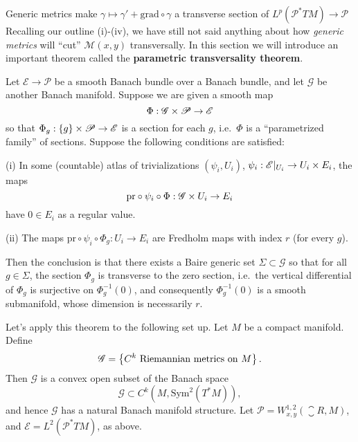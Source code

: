 \documentclass{amsart}
\begin{document}
\begin{clear}{Generic metrics make $\gamma\mapsto
    \gamma'+\text{grad}\circ \gamma$ a transverse section of
    $L^{p}(\mathscr{P}^{*}TM)\to \mathscr{P}$}
  Recalling our outline (i)-(iv), we have still not said anything
  about how \emph{generic metrics} will ``cut'' $\mathscr{M}(x,y)$
  transversally. In this section we will introduce an important
  theorem called the \textbf{parametric transversality theorem}.

  \begin{thm}
    Let $\mathscr{E}\to \mathscr{P}$ be a smooth Banach bundle over a
    Banach bundle, and let $\mathscr{G}$ be another Banach
    manifold. Suppose we are given a smooth map
    \begin{equation*}
      \Phi:\mathscr{G}\times \mathscr{P}\to \mathscr{E}
    \end{equation*}
    so that $\Phi_{g}:\left\{g\right\}\times \mathscr{P}\to \mathscr{E}$ is a
    section for each $g$, i.e.\ $\Phi$ is a ``parametrized family'' of
    sections. Suppose the following conditions are satisfied:

    (i) In some (countable) atlas of trivializations
    $(\psi_{i},U_{i})$, $\psi_{i}:\mathscr{E}|_{U_{i}}\to U_{i}\times
    E_{i}$, the maps
    \begin{equation*}
      \text{pr}\circ \psi_{i}\circ\Phi:\mathscr{G}\times U_{i}\to E_{i}
    \end{equation*}
    have $0\in E_{i}$ as a regular value. 

    (ii) The maps $\text{pr}\circ \psi_{i}\circ \Phi_{g}:U_{i}\to
    E_{i}$ are Fredholm maps with index $r$ (for every $g$). 

    Then the conclusion is that there exists a Baire generic set
    $\Sigma\subset \mathscr{G}$ so that for all $g\in \Sigma$, the
    section $\Phi_{g}$ is transverse to the zero section, i.e.\ the
    vertical differential of $\Phi_{g}$ is surjective on
    $\Phi_{g}^{-1}(0)$, and consequently $\Phi_{g}^{-1}(0)$ is a
    smooth submanifold, whose dimension is necessarily $r$.
  \end{thm}

  \begin{example}
    Let's apply this theorem to the following set up. Let $M$ be a
    compact manifold. Define
    \begin{equation*}
      \mathscr{G}=\left\{C^{k}\text{ Riemannian metrics on $M$}\right\}.
    \end{equation*}
    Then $\mathscr{G}$ is a convex open subset of the Banach space
    \begin{equation*}
      \mathscr{G}\subset C^{k}(M,\text{Sym}^{2}(T^{*}M)),
    \end{equation*}
    and hence $\mathscr{G}$ has a natural Banach manifold
    structure. Let $\mathscr{P}=W^{1,2}_{x,y}(\closure{R},M)$, and
    $\mathscr{E}=L^{2}(\mathscr{P}^{*}TM)$, as above. 


\end{example}
\end{clear}
\end{document}
